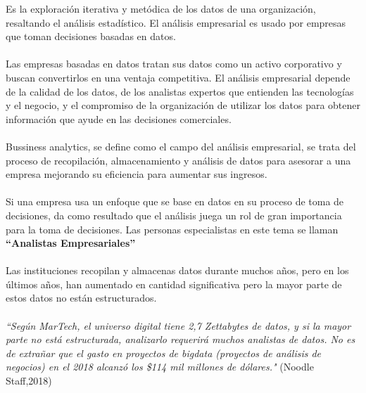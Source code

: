 \documentclass[twoside,twocolumn]{article}
\begin{document}
Es la exploración iterativa y metódica de los datos de una organización, resaltando el análisis estadístico. El análisis empresarial es usado por empresas que toman decisiones basadas en datos. 
\\ \\
Las empresas basadas en datos tratan sus datos como un activo corporativo y buscan convertirlos en una ventaja competitiva. El análisis empresarial depende de la calidad de los datos, de los analistas expertos que entienden las tecnologías y el negocio, y el compromiso de la organización de utilizar los datos para obtener información que ayude en las decisiones comerciales.
\\ \\
Bussiness analytics, se define como el campo del análisis empresarial, se trata del proceso de recopilación, almacenamiento y análisis de datos para asesorar a una empresa mejorando su eficiencia para aumentar sus ingresos.
\\ \\
Si una empresa usa un enfoque que se base en datos en su proceso de toma de decisiones, da como resultado que el análisis juega un rol de gran importancia para la toma de decisiones.  Las personas especialistas en este tema se llaman \textbf{ “Analistas Empresariales”}
\\ \\
Las instituciones recopilan y almacenas datos durante muchos años, pero en los últimos años, han aumentado en cantidad significativa pero la mayor parte de estos datos no están estructurados.  
\\ \\

\textsl{“Según MarTech, el universo digital tiene 2,7 Zettabytes de datos, y si la mayor parte no está estructurada, analizarlo requerirá muchos analistas de datos.  No es de extrañar que el gasto en proyectos de bigdata (proyectos de análisis de negocios) en el 2018 alcanzó los \$114 mil millones de dólares."} (Noodle Staff,2018)
\end{document}
